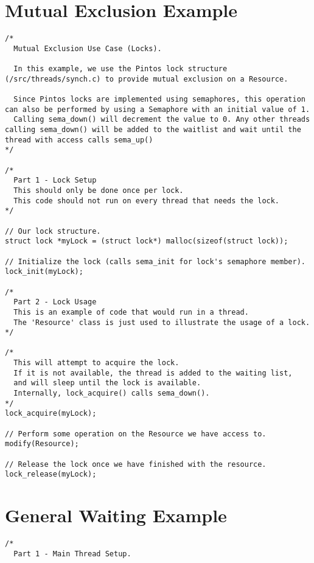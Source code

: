 \documentclass[11pt, letterpaper]{article}
\begin{document}
\pagebreak
\begin{appendices}

\section{Mutual Exclusion Example}
\begin{lstlisting}[frame=single,basicstyle=\footnotesize]
/*
  Mutual Exclusion Use Case (Locks).

  In this example, we use the Pintos lock structure (/src/threads/synch.c) to provide mutual exclusion on a Resource.

  Since Pintos locks are implemented using semaphores, this operation can also be performed by using a Semaphore with an initial value of 1. 
  Calling sema_down() will decrement the value to 0. Any other threads calling sema_down() will be added to the waitlist and wait until the thread with access calls sema_up()
*/

/*
  Part 1 - Lock Setup
  This should only be done once per lock. 
  This code should not run on every thread that needs the lock.
*/

// Our lock structure.
struct lock *myLock = (struct lock*) malloc(sizeof(struct lock));

// Initialize the lock (calls sema_init for lock's semaphore member).
lock_init(myLock);

/*
  Part 2 - Lock Usage
  This is an example of code that would run in a thread. 
  The 'Resource' class is just used to illustrate the usage of a lock.
*/

/*
  This will attempt to acquire the lock. 
  If it is not available, the thread is added to the waiting list, 
  and will sleep until the lock is available.
  Internally, lock_acquire() calls sema_down(). 
*/    
lock_acquire(myLock);

// Perform some operation on the Resource we have access to.
modify(Resource);

// Release the lock once we have finished with the resource.
lock_release(myLock);
\end{lstlisting}

\pagebreak

\section{General Waiting Example}
\begin{lstlisting}[frame=single,basicstyle=\footnotesize]
/*
  Part 1 - Main Thread Setup.


\end{lstlisting}
\end{appendices}
\end{document}
